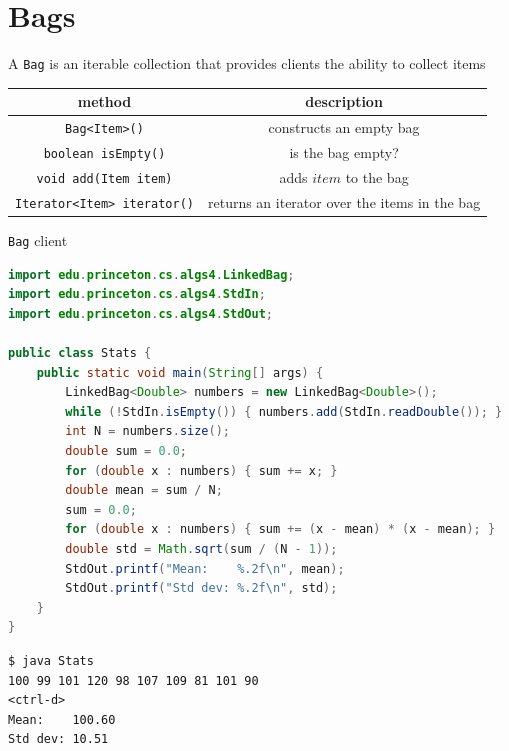\documentclass[8pt,a4paper,compress]{beamer}
\begin{document}
\section{Bags}
\begin{frame}[fragile]
A \lstinline{Bag} is an iterable collection that provides clients the ability to collect items
\begin{center}
\begin{tabular}{cc}
method & description \\ \hline
\lstinline$Bag<Item>()$ & constructs an empty bag \\
\lstinline$boolean isEmpty()$ & is the bag empty? \\
\lstinline$void add(Item item)$ & adds $item$ to the bag \\
\lstinline$Iterator<Item> iterator()$ & returns an iterator over the items in the bag
\end{tabular} 
\end{center}

\lstinline{Bag} client
\begin{lstlisting}[language=Java]
import edu.princeton.cs.algs4.LinkedBag;
import edu.princeton.cs.algs4.StdIn;
import edu.princeton.cs.algs4.StdOut;

public class Stats {
    public static void main(String[] args) {
        LinkedBag<Double> numbers = new LinkedBag<Double>();
        while (!StdIn.isEmpty()) { numbers.add(StdIn.readDouble()); }
        int N = numbers.size();
        double sum = 0.0;
        for (double x : numbers) { sum += x; }
        double mean = sum / N;
        sum = 0.0;
        for (double x : numbers) { sum += (x - mean) * (x - mean); }
        double std = Math.sqrt(sum / (N - 1));
        StdOut.printf("Mean:    %.2f\n", mean);
        StdOut.printf("Std dev: %.2f\n", std);
    }
}
\end{lstlisting}

\begin{lstlisting}[language={}]
$ java Stats
100 99 101 120 98 107 109 81 101 90
<ctrl-d>
Mean:    100.60
Std dev: 10.51
\end{lstlisting}
\end{frame}
\end{document}
